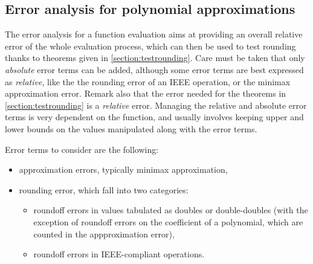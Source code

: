 \subsection{Error analysis for polynomial approximations \label{sec:error_maple}}


The error analysis for a function evaluation aims at providing an
overall relative error of the whole evaluation process, which can then
be used to test rounding thanks to theorems given in
\ref{section:testrounding}. Care must be taken that only
\emph{absolute} error terms can be added, although some error terms
are best expressed as \emph{relative}, like the the rounding error of
an IEEE operation, or the minimax approximation error. Remark also
that the error needed for the theorems in \ref{section:testrounding}
is a \emph{relative} error. Managing the relative and absolute error
terms is very dependent on the function, and usually involves keeping
upper and lower bounds on the values manipulated along with the error terms.

Error terms to consider are the following:
\begin{itemize}
\item approximation errors, typically minimax approximation,
\item rounding error, which fall into two categories:
  \begin{itemize}
  \item roundoff errors in values tabulated as doubles or
    double-doubles (with the exception of roundoff errors on the coefficient
    of a polynomial, which are counted in the appproximation error),
  \item roundoff errors in IEEE-compliant operations.
  \end{itemize}
\end{itemize}




